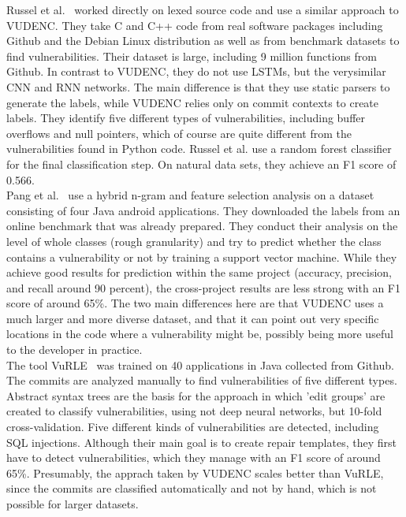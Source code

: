 \documentclass[
a4paper,
pagesize,
pdftex,
12pt,
twoside, %
BCOR=5mm, %
ngerman,
fleqn,
final,
]{scrartcl}
\begin{document}
	Russel et al.~\cite{Russell.2018} worked directly on lexed source code and use a similar approach to VUDENC. They take C and C++ code from real software packages including Github and the Debian Linux distribution as well as from benchmark datasets to find vulnerabilities. Their dataset is large, including 9 million functions from Github. In contrast to VUDENC, they do not use LSTMs, but the verysimilar CNN and RNN networks. The main difference is that they use static parsers to generate the labels, while  VUDENC relies only on commit contexts to create labels. They identify five different types of vulnerabilities, including buffer overflows and null pointers, which of course are quite different from the vulnerabilities found in Python code. Russel et al. use a random forest classifier for the final classification step. On natural data sets, they achieve an F1 score of 0.566.\\
	Pang et al.~\cite{Pang.2015} use a hybrid n-gram and feature selection analysis on a dataset consisting of four Java android applications. They downloaded the labels from an online benchmark that was already prepared. They conduct their analysis on the level of whole classes (rough granularity) and try to predict whether the class contains a vulnerability or not by training a support vector machine. While they achieve good results for prediction within the same project (accuracy, precision, and recall around 90 percent), the cross-project results are less strong with an F1 score of around 65\%. The two main differences here are that VUDENC uses a much larger and more diverse dataset, and that it can point out very specific locations in the code where a vulnerability might be, possibly being more useful to the developer in practice.\\
	The tool VuRLE~\cite{Ma.2017} was trained on 40 applications in Java collected from Github. The commits are analyzed manually to find vulnerabilities of five different types. Abstract syntax trees are the basis for the approach in which 'edit groups' are created to classify vulnerabilities, using not deep neural networks, but 10-fold cross-validation. Five different kinds of vulnerabilities are detected, including SQL injections. Although their main goal is to create repair templates, they first have to detect vulnerabilities, which they manage with an F1 score of around 65\%. Presumably, the apprach taken by VUDENC scales better than VuRLE, since the commits are classified automatically and not by hand, which is not possible for larger datasets.\\ 
\end{document}
